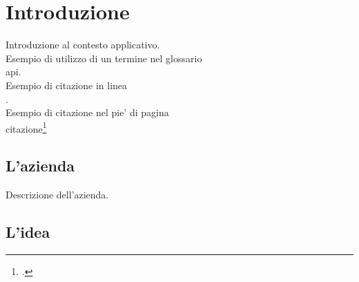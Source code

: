 
\chapter{Introduzione}
\label{cap:introduzione}

Introduzione al contesto applicativo.\\

\noindent Esempio di utilizzo di un termine nel glossario \\
\gls{api}. \\

\noindent Esempio di citazione in linea \\
\cite{site:agile-manifesto}. \\

\noindent Esempio di citazione nel pie' di pagina \\
citazione\footcite{womak:lean-thinking} \\

\section{L'azienda}

Descrizione dell'azienda.

\section{L'idea}


